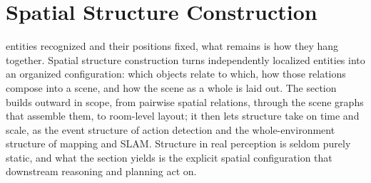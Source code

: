 
\section{Spatial Structure Construction}
\label{sec:p3-sec6-3-spatial-structure-construction}

 entities recognized and their positions fixed, what remains is how they hang together. Spatial structure construction turns independently localized entities into an organized configuration: which objects relate to which, how those relations compose into a scene, and how the scene as a whole is laid out. The section builds outward in scope, from pairwise spatial relations, through the scene graphs that assemble them, to room-level layout; it then lets structure take on time and scale, as the event structure of action detection and the whole-environment structure of mapping and SLAM. Structure in real perception is seldom purely static, and what the section yields is the explicit spatial configuration that downstream reasoning and planning act on.















